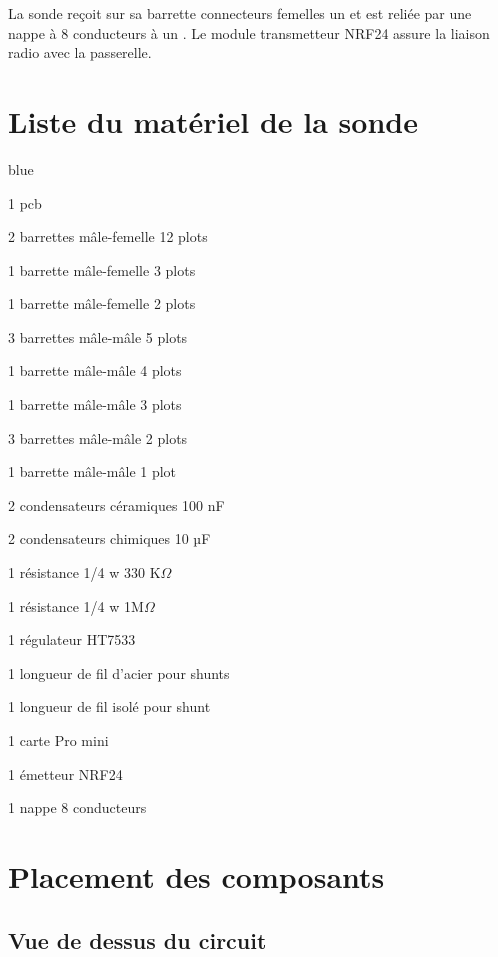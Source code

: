 La sonde reçoit sur sa barrette connecteurs femelles un  et est reliée par une nappe à 8 conducteurs à un .
Le module transmetteur NRF24 assure la liaison radio avec la passerelle. 

\section{Liste du matériel de la sonde}

\begin{items}{blue}{\Triangle}
\item 1 pcb
\item 2 barrettes mâle-femelle 12 plots		
\item 1 barrette mâle-femelle 3 plots	
\item 1 barrette mâle-femelle 2 plots	
\item 3 barrettes mâle-mâle 5 plots		
\item 1 barrette mâle-mâle 4 plots		
\item 1 barrette mâle-mâle 3 plots		
\item 3 barrettes mâle-mâle 2 plots		
\item 1 barrette mâle-mâle 1 plot		
\item 2 condensateurs céramiques 100 nF
\item 2 condensateurs chimiques    10 µF
\item 1 résistance 1/4 w  330 K$\Omega$
\item 1 résistance 1/4 w 1M$\Omega$
\item 1 régulateur HT7533
\item 1 longueur de fil d'acier pour shunts
\item 1 longueur de fil isolé pour shunt
\item 1 carte Pro mini
\item 1 émetteur NRF24
\item 1 nappe 8 conducteurs
\end{items}

\section{Placement des composants}

\subsection{Vue de dessus du circuit}
\label{TEST}


